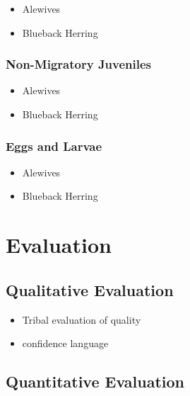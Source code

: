 \documentclass[
]{book}
\providecommand{\tightlist}{%
  \setlength{\itemsep}{0pt}\setlength{\parskip}{0pt}}
\begin{document}
\begin{itemize}
\tightlist
\item
  Alewives
\item
  Blueback Herring
\end{itemize}

\hypertarget{non-migratory-juveniles-4}{%
\subsection{Non-Migratory Juveniles}\label{non-migratory-juveniles-4}}

\begin{itemize}
\tightlist
\item
  Alewives
\item
  Blueback Herring
\end{itemize}

\hypertarget{eggs-and-larvae-1}{%
\subsection{Eggs and Larvae}\label{eggs-and-larvae-1}}

\begin{itemize}
\tightlist
\item
  Alewives
\item
  Blueback Herring
\end{itemize}

\hypertarget{evaluation}{%
\chapter{Evaluation}\label{evaluation}}

\hypertarget{qualitative-evaluation}{%
\section{Qualitative Evaluation}\label{qualitative-evaluation}}

\begin{itemize}
\tightlist
\item
  Tribal evaluation of quality
\item
  confidence language
\end{itemize}

\hypertarget{quantitative-evaluation}{%
\section{Quantitative Evaluation}\label{quantitative-evaluation}}
\end{document}
